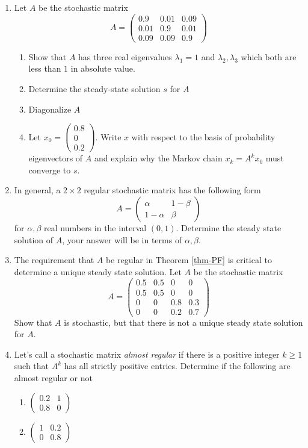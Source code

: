 \documentclass[12pt]{article}
\numberwithin{equation}{subsection}
\numberwithin{figure}{subsection}
\theoremstyle{note}
\begin{document}
\begin{enumerate}[label=\arabic*.]
	
	\item Let $A$ be the stochastic matrix \[ A=\begin{pmatrix} 0.9 & 0.01 & 0.09 \\ 0.01 & 0.9 & 0.01 \\ 0.09 & 0.09 &0.9 \end{pmatrix}\]
	\begin{enumerate} 
		\item Show that $A$ has three real eigenvalues $\lambda_1=1$ and $\lambda_2,\lambda_3$ which both are less than $1$ in absolute value. 
		\item Determine the steady-state solution $s$ for $A$
		\item Diagonalize $A$
		\item Let $x_0=\begin{pmatrix} 0.8 \\ 0 \\ 0.2\end{pmatrix}$. Write $x$ with respect to the basis of probability eigenvectors of $A$ and explain why the Markov chain $x_k=A^k x_0$ must  converge to $s$. 
	\end{enumerate}
	\item In general, a $2\times 2$ regular stochastic matrix has the following form \begin{equation} A=\begin{pmatrix} \alpha & 1-\beta \\ 1-\alpha & \beta\end{pmatrix} \end{equation} for $\alpha,\beta$ real numbers in the interval $(0,1)$. Determine the steady state solution of $A$, your answer will be in terms of $\alpha,\beta$. 
	
	\item The requirement that $A$ be regular in Theorem \ref{thm-PF} is critical to determine a unique steady state solution. Let $A$ be the stochastic matrix \[ A=\begin{pmatrix} 0.5 & 0.5 & 0 & 0  \\ 0.5 & 0.5 & 0 & 0 \\ 0 & 0 & 0.8 & 0.3 \\ 0 & 0 & 0.2 & 0.7\end{pmatrix}\] Show that $A$ is stochastic, but that there is not a unique steady state solution for $A$. 
	\item \label{ex-regular-stoch} Let's call a stochastic matrix \textit{almost regular} if there is a positive integer $k\geq 1$ such that $A^k$ has all strictly positive entries. Determine if the following are almost regular or not
	\begin{enumerate}
		\item $\begin{pmatrix} 0.2 & 1 \\ 0.8 & 0 \end{pmatrix}$
		\item $\begin{pmatrix} 1 & 0.2 \\ 0 & 0.8\end{pmatrix}$
	\end{enumerate}
\end{enumerate}
\end{document}
